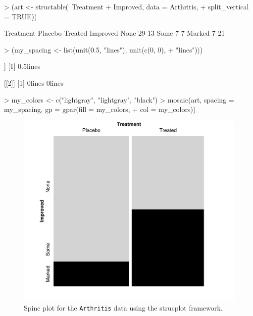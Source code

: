 \documentclass{Z}
\newcommand{\data}[1]{\texttt{#1}}
\begin{document}
\begin{Schunk}
\begin{Sinput}
> (art <- structable(~Treatment + Improved, data = Arthritis, 
+     split_vertical = TRUE))
\end{Sinput}
\begin{Soutput}
         Treatment Placebo Treated
Improved                          
None                    29      13
Some                     7       7
Marked                   7      21
\end{Soutput}
\begin{Sinput}
> (my_spacing <- list(unit(0.5, "lines"), unit(c(0, 0), 
+     "lines")))
\end{Sinput}
\begin{Soutput}
[[1]]
[1] 0.5lines

[[2]]
[1] 0lines 0lines
\end{Soutput}
\begin{Sinput}
> my_colors <- c("lightgray", "lightgray", "black")
> mosaic(art, spacing = my_spacing, gp = gpar(fill = my_colors, 
+     col = my_colors))
\end{Sinput}
\end{Schunk}

\begin{figure}[p]
\begin{center}
\includegraphics{strucplot-artspinefig}
\caption{Spine plot for the \data{Arthritis} data using the strucplot framework.}
\label{fig:artspine}
\end{center}
\end{figure}
\end{document}
